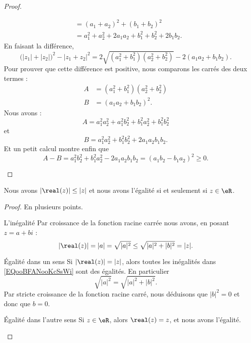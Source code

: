 \begin{proof}
\begin{subproof}
\begin{subequations}
\begin{align}
				              & =(a_1+a_2)^2+(b_1+b_2)^2                  \\
				              & =a_1^2+a_2^2+2a_1a_2+b_1^2+b_2^2+2b_1b_2.
			\end{align}
		\end{subequations}
		En faisant la différence,
		\begin{equation}
			\big( | z_1 |+|z_2| \big)^2-| z_1+z_2 |^2=2\sqrt{ (a_1^2+b_1^2)(a_2^2+b_2^2) }-2(a_1a_2+b_1b_2).
		\end{equation}
		Pour prouver que cette différence est positive, nous comparons les carrés des deux termes :
		\begin{subequations}
			\begin{align}
				A & =(a_1^2+b_1^2)(a_2^2+b_2^2) \\
				B & =(a_1a_2+b_1b_2)^2.
			\end{align}
		\end{subequations}
		Nous avons :
		\begin{equation}
			A=a_1^2a_2^2+a_1^2b_2^2+b_1^2a_2^2+b_1^2b_2^2
		\end{equation}
		et
		\begin{equation}
			B=a_1^2a_2^2+b_1^2b_2^2+2a_1a_2b_1b_2.
		\end{equation}
		Et un petit calcul montre enfin que
		\begin{equation}
			A-B=a_1^2b_2^2+b_1^2a_2^2-2a_1a_2b_1b_2=(a_1b_2-b_1a_2)^2\geq 0.
		\end{equation}
	\end{subproof}
\end{proof}


\begin{lemma}       \label{LEMooHTAWooQNrXSL}
	Nous avons \( | \real(z) |\leq | z |\) et nous avons l'égalité si et seulement si \( z\in \eR\).
\end{lemma}

\begin{proof}
	En plusieurs points.
	\begin{subproof}
		\item[L'inégalité]
		Par croissance de la fonction racine carrée nous avons, en posant \( z=a+bi\) :
		\begin{equation}        \label{EQooBFANooKcSsWi}
			| \real(z) |=| a |=\sqrt{ | a |^2 }\leq \sqrt{ | a |^2+| b |^2 }=| z |.
		\end{equation}
		\item[Égalité dans un sens]
		Si \( | \real(z) |=| z |\), alors toutes les inégalités dans \eqref{EQooBFANooKcSsWi} sont des égalités. En particulier
		\begin{equation}
			\sqrt{ | a |^2 }=\sqrt{ | a |^2+| b |^2 }.
		\end{equation}
		Par stricte croissance de la fonction racine carré, nous déduisons que \( | b |^2=0\) et donc que \( b=0\).
		\item[Égalité dans l'autre sens]
		Si \( z\in \eR\), alors \( \real(z)=z\), et nous avons l'égalité.
	\end{subproof}
\end{proof}

